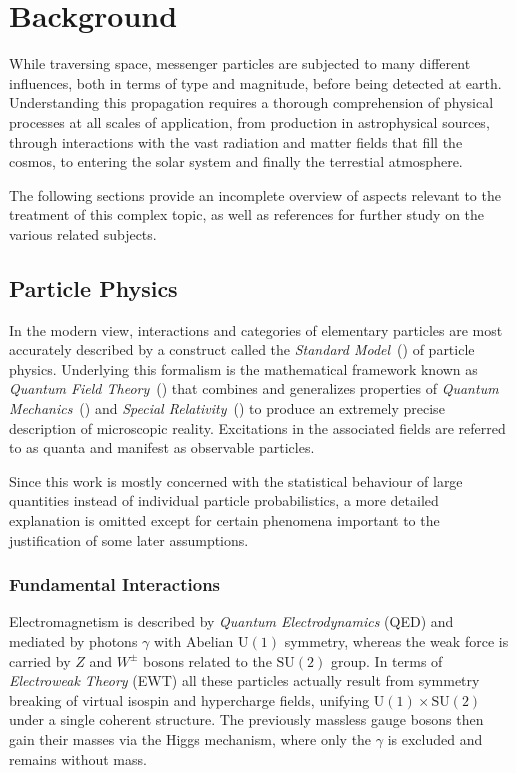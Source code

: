 \chapter{Background}
\label{ch:background}

While traversing space, messenger particles are subjected to many different influences, both in terms of type and magnitude, before being
detected at earth. Understanding this propagation requires a thorough comprehension of physical processes at all scales of application,
from production in astrophysical sources, through interactions with the vast radiation and matter fields that fill the cosmos, to entering
the solar system and finally the terrestial atmosphere.

The following sections provide an incomplete overview of aspects relevant to the treatment of this complex topic, as well as references
for further study on the various related subjects.

\section{Particle Physics}
\label{sec:particle}

In the modern view, interactions and categories of elementary particles are most accurately described by a construct called the
\emph{Standard Model}~() of particle physics. Underlying this formalism is the mathematical framework known as
\emph{Quantum Field Theory}~() that combines and generalizes properties of
\emph{Quantum Mechanics}~() and \emph{Special Relativity}~() to produce an extremely precise description
of microscopic reality. Excitations in the associated fields are referred to as quanta and manifest as observable particles.

Since this work is mostly concerned with the statistical behaviour of large quantities instead of individual particle probabilistics,
a more detailed explanation is omitted except for certain phenomena important to the justification of some later assumptions.

\subsection*{Fundamental Interactions}
\label{sub:interactions}

Electromagnetism is described by \emph{Quantum Electrodynamics} (QED) and mediated by photons $\gamma$ with Abelian $\text{U}(1)$ symmetry,
whereas the weak force is carried by $Z$ and $W^\pm$ bosons related to the $\text{SU}(2)$ group. In terms of \emph{Electroweak Theory} (EWT)
all these particles actually result from symmetry breaking of virtual isospin and hypercharge fields, unifying $\text{U}(1) \times \text{SU}(2)$
under a single coherent structure. The previously massless gauge bosons then gain their masses via the Higgs mechanism, where only the
$\gamma$ is excluded and remains without mass.

